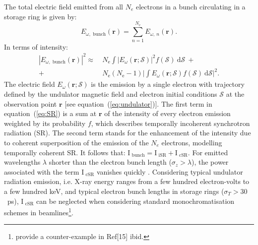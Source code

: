 \documentclass{iucr}              %
\begin{document}
The total electric field emitted from all $N_e$ electrons in a bunch circulating in a storage ring is given by: 
\begin{equation}
    E_{\omega,\text{~bunch}}(\textbf{r}) = \sum_{n=1}^{N_e} E_{\omega,~n}(\textbf{r}).
\end{equation}
In terms of intensity: 
\begin{equation}
\begin{split}
|E_{\omega,\text{~bunch}}(\textbf{r})|^2 \approx ~&N_\text{e} \int\big| E_\omega(\textbf{r};\mathcal{S})\big|^2 f(\mathcal{S})~ \text{d}\mathcal{S}~+\\
+~ &N_\text{e}(N_\text{e}-1)\bigg| \int E_\omega(\textbf{r};\mathcal{S}) f(\mathcal{S})~ \text{d}\mathcal{S} \bigg|^2.
\end{split}
\label{eq:SR}
\end{equation}
The electric field $E_\omega(\textbf{r};\mathcal{S})$ is the emission by a single electron with trajectory defined by the undulator magnetic field and electron initial conditions $\mathcal{S}$
at the observation point $\textbf{r}$ [see equation~(\ref{eq:undulator})]. The first term in equation~(\ref{eq:SR}) is a sum at $\textbf{r}$ of the intensity of every electron emission weighted by its probability $f$, which describes temporally incoherent synchrotron radiation (SR). The second term stands for the enhancement of the intensity due to coherent superposition of the emission of the $N_e$ electrons, modelling temporally coherent SR. It follows that: $\text{I}_\text{~bunch} = \text{I}_\text{~iSR}+\text{I}_\text{~cSR}$.
For emitted wavelengths $\lambda$ shorter than the electron bunch length ($\sigma_z > \lambda$), the power associated with the term $\text{I}_\text{~cSR}$ vanishes quickly \cite{CSR,Wiedemann2015}. Considering typical undulator radiation emission, i.e. X-ray energy ranges from a few hundred electron-volts to a few hundred keV, and typical electron bunch lengths in storage rings ($\sigma_{T}>30$~ps), $\text{I}_\text{~cSR}$ can be neglected when considering standard monochromatisation schemes in beamlines\footnote{ provide a counter-example in Ref[15] ibid.}.
\end{document}
